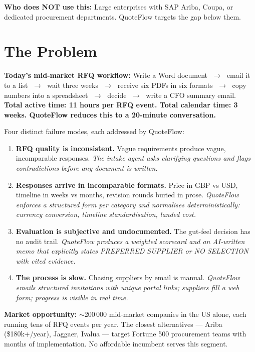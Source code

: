 \documentclass[11pt, a4paper]{article}
\begin{document}
\textbf{Who does NOT use this:} Large enterprises with SAP Ariba, Coupa, or
dedicated procurement departments. QuoteFlow targets the gap below them.

\section{The Problem}

\begin{brandbox}
\textbf{Today's mid-market RFQ workflow:}
Write a Word document $\;\to\;$ email it to a list $\;\to\;$ wait three weeks
$\;\to\;$ receive six PDFs in six formats $\;\to\;$ copy numbers into a
spreadsheet $\;\to\;$ decide $\;\to\;$ write a CFO summary email.
\textbf{Total active time: 11 hours per RFQ event. Total calendar time: 3 weeks.
QuoteFlow reduces this to a 20-minute conversation.}
\end{brandbox}

Four distinct failure modes, each addressed by QuoteFlow:

\begin{enumerate}
  \item \textbf{RFQ quality is inconsistent.} Vague requirements produce vague,
    incomparable responses. \textit{The intake agent asks clarifying questions
    and flags contradictions before any document is written.}

  \item \textbf{Responses arrive in incomparable formats.} Price in GBP vs USD,
    timeline in weeks vs months, revision rounds buried in prose.
    \textit{QuoteFlow enforces a structured form per category and normalises
    deterministically: currency conversion, timeline standardisation, landed
    cost.}

  \item \textbf{Evaluation is subjective and undocumented.} The gut-feel decision
    has no audit trail. \textit{QuoteFlow produces a weighted scorecard and an
    AI-written memo that explicitly states PREFERRED SUPPLIER or NO SELECTION
    with cited evidence.}

  \item \textbf{The process is slow.} Chasing suppliers by email is manual.
    \textit{QuoteFlow emails structured invitations with unique portal links;
    suppliers fill a web form; progress is visible in real time.}
\end{enumerate}

\textbf{Market opportunity:} $\sim$200\,000 mid-market companies in the US alone,
each running tens of RFQ events per year. The closest alternatives --- Ariba
(\$180k+/year), Jaggaer, Ivalua --- target Fortune 500 procurement teams with
months of implementation. No affordable incumbent serves this segment.
\end{document}
